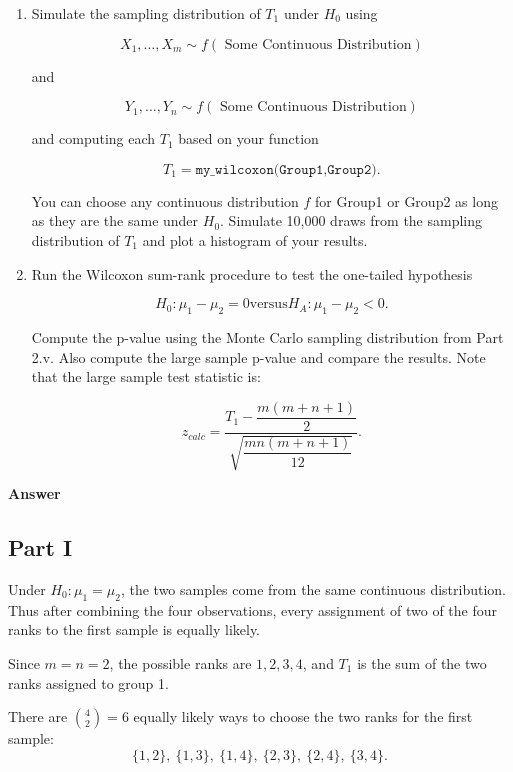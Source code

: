 \documentclass[letterpaper]{article}
\begin{document}
\begin{enumerate}
		\[
		\texttt{wilcox.test(Group1,Group2)}
		\]
		
		is technically computing the Mann-Whitney $U$ statistic.
		
		\item[v] Simulate the sampling distribution of $T_1$ under $H_0$ using
		
		\[
		X_1,\dots,X_m \sim f
		(\text{ Some Continuous Distribution})
		\]
		
		and
		
		\[
		Y_1,\dots,Y_n \sim f
		(\text{ Some Continuous Distribution})
		\]
		
		and computing each $T_1$ based on your function
		
		\[
		T_1=\texttt{my\_wilcoxon(Group1,Group2)}.
		\]
		
		You can choose any continuous distribution $f$ for Group1 or Group2 as long as they are the same under $H_0$. Simulate 10,000 draws from the sampling distribution of $T_1$ and plot a histogram of your results.
		
		
		\item[vi] Run the Wilcoxon sum-rank procedure to test the one-tailed hypothesis
		
		\[
		H_0 : \mu_1 - \mu_2 = 0 
		\text{versus} 
		H_A : \mu_1 - \mu_2 < 0.
		\]
		
		Compute the p-value using the Monte Carlo sampling distribution from Part 2.v. Also compute the large sample p-value and compare the results. Note that the large sample test statistic is:
		
		\[
		z_{calc}=
		\frac{
			T_1-\dfrac{m(m+n+1)}{2}
		}{
			\sqrt{\dfrac{mn(m+n+1)}{12}}
		}.
		\]
	\end{enumerate}
	
	\textbf{Answer}
	
	\subsection{Part I}
	
	
	Under $H_0:\mu_1=\mu_2$, the two samples come from the same continuous distribution.
	Thus after combining the four observations, every assignment of two of the four
	ranks to the first sample is equally likely.
	
	Since $m=n=2$, the possible ranks are $1,2,3,4$, and $T_1$ is the sum of the two
	ranks assigned to group 1.
	
	There are $\binom{4}{2}=6$ equally likely ways to choose the two ranks for the
	first sample:
	\[
	\{1,2\},\ \{1,3\},\ \{1,4\},\ \{2,3\},\ \{2,4\},\ \{3,4\}.
	\]
	
\end{document}
